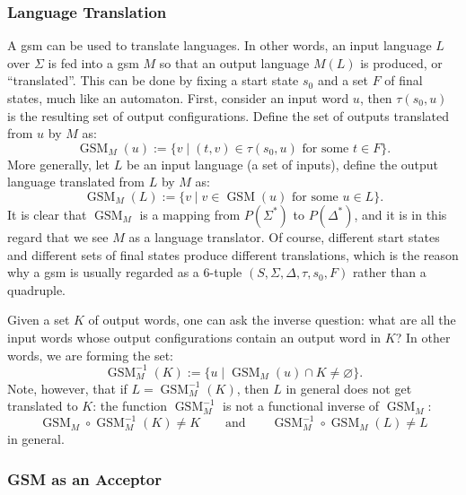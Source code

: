 \documentclass[12pt]{article}
\begin{document}
\subsubsection*{Language Translation}

A gsm can be used to translate languages.  In other words, an input language $L$ over $\Sigma$ is fed into a gsm $M$ so that an output language $M(L)$ is produced, or ``translated''.  This can be done by fixing a start state $s_0$ and a set $F$ of final states, much like an automaton.  First, consider an input word $u$, then $\tau(s_0,u)$ is the resulting set of output configurations.  Define the set of outputs translated from $u$ by $M$ as: $$\operatorname{GSM}_M(u):=\lbrace v \mid (t,v)\in \tau(s_0,u)\mbox{ for some }t\in F\rbrace.$$
More generally, let $L$ be an input language (a set of inputs), define the output language translated from $L$ by $M$ as: $$\operatorname{GSM}_M(L):=\lbrace v \mid v\in\operatorname{GSM}(u)\mbox{ for some }u\in L\rbrace.$$
It is clear that $\operatorname{GSM}_M$ is a mapping from $P(\Sigma^*)$ to $P(\Delta^*)$, and it is in this regard that we see $M$ as a language translator.  Of course, different start states and different sets of final states produce different translations, which is the reason why a gsm is usually regarded as a 6-tuple $(S,\Sigma,\Delta,\tau,s_0,F)$ rather than a quadruple.

Given a set $K$ of output words, one can ask the inverse question: what are all the input words whose output configurations contain an output word in $K$?  In other words, we are forming the set:
$$\operatorname{GSM}^{-1}_M(K):=\lbrace u\mid \operatorname{GSM}_M(u)\cap K\ne \varnothing \rbrace.$$
Note, however, that if $L=\operatorname{GSM}^{-1}_M(K)$, then $L$ in general does not get translated to $K$: the function $\operatorname{GSM}^{-1}_M$ is not a functional inverse of $\operatorname{GSM}_M$: $$\operatorname{GSM}_M\circ \operatorname{GSM}^{-1}_M(K) \ne K \qquad \mbox{and} \qquad \operatorname{GSM}_M^{-1}\circ \operatorname{GSM}_M(L) \ne L$$ in general.

\subsubsection*{GSM as an Acceptor}
\end{document}
